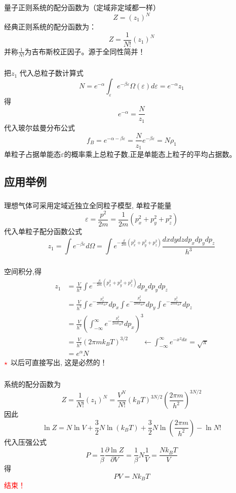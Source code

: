 \begin{frame}
  \frametitle{}
量子正则系统的配分函数为（定域非定域都一样）
\[ Z = (z_1)^N \]
经典正则系统的配分函数为：
\[ \boxed{Z = \frac{1}{N!} (z_1)^N}  \]
并称$ \frac{1}{N!}  $为吉布斯校正因子。源于全同性简并！ 
\end{frame} 

\begin{frame}
  \frametitle{}
  把$z_1$ 代入总粒子数计算式
  \[ N = e^{-\alpha} \int_{\varepsilon} e^{-\beta \varepsilon} \Omega(\varepsilon) d \varepsilon  = e^{-\alpha} z_1 \]
  得\[ e^{-\alpha} = \frac{N}{z_1}\]
  代入玻尔兹曼分布公式
  \[ f_B = e^{-\alpha -\beta \varepsilon} = \frac{N}{z_1} e^{ -\beta \varepsilon} = N \rho _1 \]
  单粒子占据单能态$\varepsilon$的概率乘上总粒子数,正是单能态上粒子的平均占据数。
\end{frame} 

\subsection{应用举例}

\begin{frame}
  \frametitle{}
  \解 理想气体可采用定域近独立全同粒子模型, 单粒子能量
  \[ \varepsilon = \frac{p^2}{2m } = \frac{1}{2m} (p_x^2 +p_y^2 + p_z^2)\]
代入单粒子配分函数公式
$$ z_1 =\int e^{-\beta \varepsilon} d \Omega  = \int e^{- \frac{\beta}{2m} (p_x^2 +p_y^2 + p_z^2)} \frac{dxdydzdp_xdp_y dp_z}{h^3} $$ 
\end{frame} 

\begin{frame}
  \frametitle{}
空间积分,得
\[ 
  \begin{aligned}
    z_1 &=\frac{V}{h^3}\int e^{- \frac{\beta}{2m} (p_x^2 +p_y^2 + p_z^2)} dp_xdp_y dp_z  \\ 
&= \frac{V}{h^3}\int e^{- \frac{p_x^2}{2mk_BT}}dp_x \int e^{- \frac{p_y^2}{2mk_BT}}dp_y \int e^{- \frac{p_z^2}{2mk_BT}}dp_z  \\
&= \frac{V}{h^3}\left(\int_{-\infty}^\infty e^{- \frac{p_x^2}{2mk_BT}}dp_x\right)^3 \\
&= \frac{V}{h^3} (2\pi mk_BT)^{3/2}  \qquad \leftarrow \int_{-\infty}^\infty e^{-x^2 dx} = \sqrt{\pi} \\
&= e^\alpha N
  \end{aligned}
\]
${\color{red}\star}$ 以后可直接写出, 这是必然的！
\end{frame} 

\begin{frame}
  \frametitle{}
系统的配分函数为
\[ Z = \frac{1}{N!} (z_1)^N = \frac{V^N}{N!} (k_BT)^{3N/2} \left(\frac{2\pi m}{h^2}\right)^{3N/2}  \]
因此
\[ \ln Z = N \ln V +\frac{3}{2}N \ln (k_BT) + \frac{3}{2} N \ln\left(\frac{2\pi m}{h^2}\right) - \ln N!  \]
代入压强公式
\[ P= \frac{1}{\beta} \frac{\partial \ln Z}{\partial V} = \frac{1}{\beta} N \frac{1}{V} = \frac{Nk_B T }{V}\]
得
\[ PV = Nk_B T\]
\textcolor{red}{结束！}
\end{frame} 

